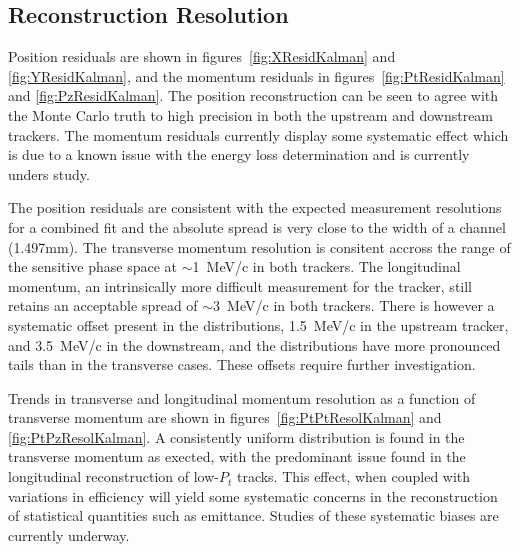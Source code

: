   \subsection{Reconstruction Resolution}
  \label{sec:performance:resolutions}
  
  Position residuals are shown in figures~\ref{fig:XResidKalman} and \ref{fig:YResidKalman}, and the momentum residuals in figures~\ref{fig:PtResidKalman} and \ref{fig:PzResidKalman}.  The position reconstruction can be seen to agree with the Monte Carlo truth to high precision in both the upstream and downstream trackers. The momentum residuals currently display some systematic effect which is due to a known issue with the energy loss determination and is currently unders study.
  
  The position residuals are consistent with the expected measurement resolutions for a combined fit and the absolute spread is very close to the width of a channel (1.497mm). The transverse momentum resolution is consitent accross the range of the sensitive phase space at $\sim$1~MeV/c in both trackers. The longitudinal momentum, an intrinsically more difficult measurement for the tracker, still retains an acceptable spread of $\sim3$~MeV/c in both trackers. There is however a systematic offset present in the distributions, 1.5~MeV/c in the upstream tracker, and 3.5~MeV/c in the downstream, and the distributions have more pronounced tails than in the transverse cases. These offsets require further investigation.
  
  Trends in transverse and longitudinal momentum resolution as a function of transverse momentum are shown in figures~\ref{fig:PtPtResolKalman} and \ref{fig:PtPzResolKalman}. A consistently uniform distribution is found in the transverse momentum as exected, with the predominant issue found in the longitudinal reconstruction of low-$P_t$ tracks. This effect, when coupled with variations in efficiency will yield some systematic concerns in the reconstruction of statistical quantities such as emittance. Studies of these systematic biases are currently underway.

